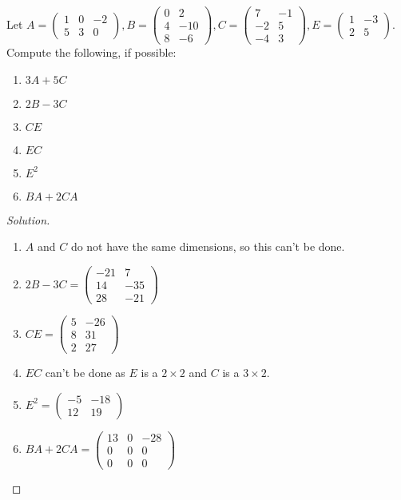     \begin{problem}
    Let $A = \begin{pmatrix} 1 & 0 & -2 \\ 5 & 3 & 0 \end{pmatrix}, B = \begin{pmatrix} 0 & 2 \\ 4 & -10 \\ 8 & -6 \end{pmatrix}, C = \begin{pmatrix} 7 & -1 \\ -2 & 5 \\ -4 & 3 \end{pmatrix}, E = \begin{pmatrix} 1 & -3 \\ 2 & 5 \end{pmatrix}$. Compute the following, if possible:
    \begin{enumerate}
        \item $3A+5C$
        \item $2B-3C$
        \item $CE$
        \item $EC$
        \item $E^2$
        \item $BA+2CA$
    \end{enumerate}
    \end{problem}
    \begin{proof}[Solution]
    \vspace{-\topsep}
    \
    \begin{enumerate}
        \item $A$ and $C$ do not have the same dimensions, so this can't be done.
        \item $2B - 3C = \begin{pmatrix} -21 & 7 \\ 14 & -35 \\ 28 & -21 \end{pmatrix}$
        \item $CE = \begin{pmatrix} 5 & -26 \\ 8 & 31 \\ 2 & 27 \end{pmatrix}$
        \item $EC$ can't be done as $E$ is a $2\times 2$ and $C$ is a $3\times 2$.
        \item $E^2 = \begin{pmatrix} -5 & -18 \\ 12 & 19 \end{pmatrix}$
        \item $BA + 2CA = \begin{pmatrix} 13 & 0 & -28 \\ 0 & 0 & 0 \\ 0 & 0 & 0 \end{pmatrix}$
    \end{enumerate}
    \end{proof}
